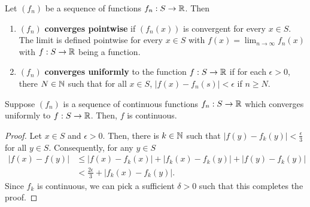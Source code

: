 \begin{definition}
	Let \(\left( f_{n} \right) \)	 be a sequence of functions \(f_{n} : S \to \mathbb{R}\). Then
	\begin{enumerate}
		\item \( \left( f_{n} \right) \) \textbf{converges pointwise} if \(\left( f_{n}\left( x \right)  \right) \) is convergent for every \(x \in S\). The limit is defined pointwise for every \(x \in S\) with \(f\left( x \right)  = \lim_{n \to \infty}f_{n} \left( x \right) \) with \(f : S \to \mathbb{R}\) being a function.
		\item \(\left( f_{n} \right) \) \textbf{converges uniformly} to the function \(f: S\to \mathbb{R}\) if for each \(\epsilon > 0\), there \( N \in \mathbb{N}\) such that for all \(x \in S\), \(\left| f\left( x \right)  - f_{n} \left( s \right)  \right| < \epsilon \) if \(n \ge N\).
	\end{enumerate}
\end{definition}
\begin{theorem}
	Suppose \(\left( f_{n} \right) \)	 is a sequence of continuous functions \(f_{n} : S \to \mathbb{R}\) which converges uniformly to \(f: S \to \mathbb{R}\). Then, \(f\) is continuous.
\end{theorem}
\begin{proof}
	Let \(x \in S\) and \(\epsilon > 0\). Then, there is \(k \in \mathbb{N}\) such that \(\left| f\left( y \right)  - f_{k} \left( y \right)  \right| < \frac{\epsilon}{3} \) for all \(y \in S\). Consequently, for any \(y \in S\)
	\begin{align*}
		\left| f\left( x \right) - f\left( y \right)  \right| &\le \left| f\left( x \right)  - f_{k}\left( x \right)  \right|  + \left| f_{k} \left( x \right) - f_{k}\left( y \right)  \right|  + \left| f\left( y \right)  - f_{k}\left( y \right)  \right| \\
								      &< \frac{2\epsilon}{3} + \left| f_{k} \left( x \right)  - f_{k}\left( y \right)  \right|
	.\end{align*}
Since \(f_{k}\) is continuous, we can pick a sufficient \(\delta >0 \) such that this completes the proof.
\end{proof}
